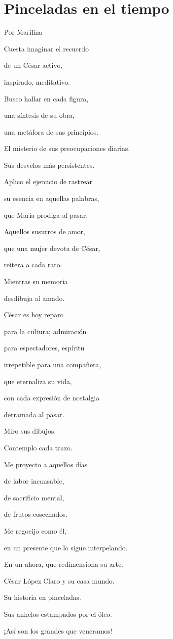 \documentclass[11pt,twoside,openright,a5paper]{book}
\begin{document}
\section*{Pinceladas en el tiempo}

\begin{flushright}Por Marilina\end{flushright}

\begin{center}
Cuesta imaginar el recuerdo 

de un César activo,

inspirado, meditativo.

Busco hallar en cada figura,

una síntesis de su obra,

una metáfora de sus principios.

El misterio de sus preocupaciones diarias.

Sus desvelos más persistentes.

Aplico el ejercicio de rastrear

su esencia en aquellas palabras,

que María prodiga al pasar.

Aquellos susurros de amor, 

que una mujer devota de César,

reitera a cada rato.

Mientras su memoria

desdibuja al amado.

César es hoy reparo 

para la cultura; admiración

para espectadores, espíritu

irrepetible para una compañera,

que eternaliza su vida,

con cada expresión de nostalgia

derramada al pasar.

Miro sus dibujos. 

Contemplo cada trazo.

Me proyecto a aquellos días

de labor incansable,

de sacrificio mental, 

de frutos cosechados.

Me regocijo como él,

en un presente que lo sigue interpelando. 

En un ahora, que redimensiona su arte.

César López Claro y su casa mundo.

Su historia en pinceladas.

Sus anhelos estampados por el óleo.

¡Así son los grandes que veneramos!
\end{center}
\end{document}
